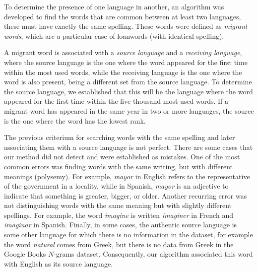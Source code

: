 \documentclass[10pt,letterpaper]{article} %
\begin{document}
% 

To determine the presence of one language in another, an algorithm was
developed to find the words that are common between at least two languages,
these must have exactly the same spelling. These words were defined
as \textit{migrant words}, which are a particular case of loanwords (with identical spelling).

A migrant word is associated with a \textit{source language} and a
\textit{receiving language}, where the source language is the one where the
word appeared for the first time within the most used words,
while the receiving language is the one where the word is also present, being a
different set from the source language. 
To determine the source language, we established that this will be the language
where the word appeared for the first time within the five thousand most used
words. If a migrant word has appeared in the same year in two or
more languages, the source is the one where the word has the lowest rank.


The previous criterium for searching words with the same spelling and later
associating them with a source language is not perfect. There are some cases
that our method did not detect and were established as mistakes. One of the
most common errors was finding words with the same writing, but with different
meanings (polysemy). For example,  \textit{mayor} in English refers to the representative
of the government in a locality, while in Spanish, \textit{mayor} is an
adjective to indicate that something is greater, bigger, or older.  Another recurring
error was not distinguishing words with the same meaning but with slightly different spellings. For example, the word \textit{imagine} is written \textit{imaginer} in
French and \textit{imaginar} in Spanish.  Finally, in some cases, the authentic
source language is some other language for which there is no information in the
dataset, for example the word \textit{natural} comes from Greek, but there is no data
from Greek in the Google Books $N$-grams dataset. Consequently, our algorithm associated this word with English as its source language.
\end{document}
